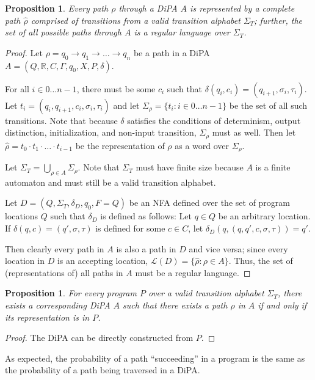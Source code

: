 \documentclass[12pt]{article}
\newcommand{\RR}{\mathbb{R}}
\newtheorem{prop}[thm]{Proposition}
\theoremstyle{definition}
\begin{document}
\begin{prop}
    Every path $\rho$ through a DiPA $A$ is represented by a complete path $\hat{\rho}$ comprised of transitions from a valid transition alphabet $\Sigma_T$; further, the set of all possible paths through $A$ is a regular language over $\Sigma_T$.
\end{prop}
\begin{proof}
    Let $\rho = q_0\to q_1\to\ldots \to q_n$ be a path in a DiPA $A=(Q, \RR, C, \Gamma, q_0, X, P, \delta)$. 

    For all $i\in 0\ldots n-1$, there must be some $c_i$ such that $\delta(q_i, c_i) = (q_{i+1}, \sigma_i, \tau_i)$. Let $t_i = (q_i, q_{i+1}, c_i, \sigma_i, \tau_i)$ and let $\Sigma_\rho = \{t_i: i\in 0\ldots n-1\}$ be the set of all such transitions. Note that because $\delta$ satisfies the conditions of determinism, output distinction, initialization, and non-input transition, $\Sigma_\rho$ must as well. 
    Then let $\hat{\rho} = t_0\cdot t_1\cdot \ldots\cdot t_{i-1}$ be the representation of $\rho$ as a word over $\Sigma_\rho$. 

    Let $\Sigma_T = \bigcup_{\rho\in A}\Sigma_\rho$. Note that $\Sigma_T$ must have finite size because $A$ is a finite automaton and must still be a valid transition alphabet.

    Let $D = (Q, \Sigma_T, \delta_D, q_0, F=Q)$ be an NFA defined over the set of program locations $Q$ such that $\delta_D$ is defined as follows:
    Let $q\in Q$ be an arbitrary location. If $\delta(q, c) = (q', \sigma, \tau)$ is defined for some $c\in C$, let $\delta_D(q, (q, q', c, \sigma, \tau)) = q'$.

    Then clearly every path in $A$ is also a path in $D$ and vice versa; since every location in $D$ is an accepting location, $\mathcal{L}(D) = \{\hat{\rho}: \rho\in A\}$. Thus, the set of (representations of) all paths in $A$ must be a regular language. 
\end{proof}

\begin{prop}
    For every program $P$ over a valid transition alphabet $\Sigma_T$, there exists a corresponding DiPA $A$ such that there exists a path $\rho$ in $A$ if and only if its representation is in $P$. 
\end{prop}
\begin{proof}
    The DiPA can be directly constructed from $P$.
\end{proof}

As expected, the probability of a path ``succeeding'' in a program is the same as the probability of a path being traversed in a DiPA. 
\end{document}
